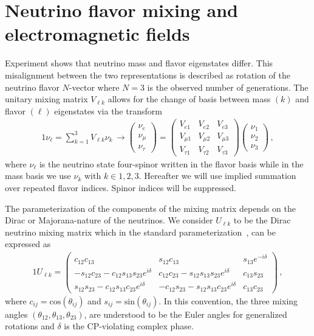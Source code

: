 \documentclass[addchapnum]{ws-rv961x669} %
\begin{document}
\section{Neutrino flavor mixing and electromagnetic fields}
\label{sec:nuflavor}
Experiment shows that neutrino mass and flavor eigenstates differ. This misalignment between the two representations is described as rotation of the neutrino flavor $N$-vector where $N=3$ is the observed number of generations. The unitary mixing matrix $V_{\ell k}$ allows for the change of basis between mass $(k)$ and flavor $(\ell)$ eigenstates via the transform 
\begin{alignat}{1}
	\label{basis:1} \nu_{\ell}=\sum_{k=1}^{3}V_{\ell k}\nu_{k}\,\rightarrow
	\begin{pmatrix}
		\nu_{e}\\
		\nu_{\mu}\\
		\nu_{\tau}
	\end{pmatrix}=
	\begin{pmatrix}
		V_{e1} & V_{e2} & V_{e3}\\
		V_{\mu1} & V_{\mu2} & V_{\mu3}\\
		V_{\tau1} & V_{\tau2} & V_{\tau3}
	\end{pmatrix}
	\begin{pmatrix}
		\nu_{1}\\
		\nu_{2}\\
		\nu_{3}
	\end{pmatrix}\,,
\end{alignat}
where $\nu_{\ell}$ is the neutrino state four-spinor written in the flavor basis while in the mass basis we use $\nu_{k}$ with $k\in1,2,3$. Hereafter we will use implied summation  over repeated flavor indices. Spinor indices will be suppressed.

The parameterization of the components of the mixing matrix depends on the Dirac or Majorana-nature of the neutrinos. We consider $U_{\ell k}$ to be the Dirac neutrino mixing matrix which in the standard parameterization~\citep{Schwartz:2014sze}, can be expressed as
\begin{alignat}{1}
	\label{rotation:1} U_{\ell k} =
	  \begin{pmatrix}
		  c_{12}c_{13} & s_{12}c_{13} & s_{13}e^{-i\delta}\\
		  -s_{12}c_{23} - c_{12}s_{13}s_{23}e^{i\delta} & c_{12}c_{23} - s_{12}s_{13}s_{23}e^{i\delta} & c_{13}s_{23}\\
		  s_{12}s_{23} - c_{12}s_{13}c_{23}e^{i\delta}& -c_{12}s_{23} - s_{12}s_{13}c_{23}e^{i\delta} & c_{13}c_{23}
	  \end{pmatrix}\,,
\end{alignat}
where $c_{ij} = \mathrm{cos}(\theta_{ij})$ and $s_{ij} = \mathrm{sin}(\theta_{ij})$. In this convention, the three mixing angles $(\theta_{12}, \theta_{13}, \theta_{23})$, are understood to be the Euler angles for generalized rotations and $\delta$ is the CP-violating complex phase. 
\end{document}
